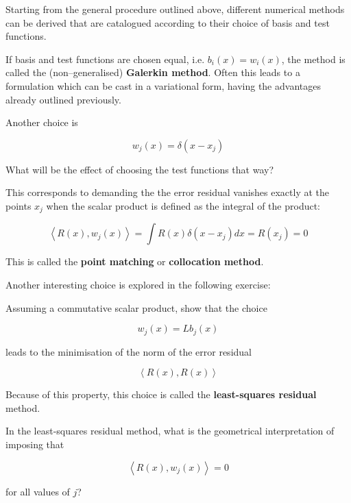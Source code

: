 Starting from the general procedure outlined above, different numerical methods can be derived that are catalogued according to their choice of basis and test functions.

If basis and test functions are chosen equal, i.e. $b_i(x) = w_i(x)$, the method is called the (non--generalised) \textbf{Galerkin method}. Often this leads to a formulation which can be cast in a variational form, having the advantages already outlined previously.

Another choice is

\begin{equation}
w_j(x) = \delta(x-x_j)
\end{equation} 

\begin{cue}
What will be the effect of choosing the test functions that way?  
\end{cue}

This corresponds to demanding the the error residual vanishes exactly at the points $x_j$ when the scalar product is defined as the integral of the product:

\begin{equation}
\left\langle R(x), w_j(x) \right\rangle = \int R(x) \delta(x-x_j) dx = R(x_j) = 0
\end{equation} 

This is called the \textbf{point matching} or \textbf{collocation method}.

Another interesting choice is explored in the following exercise:

\pagebreak

\begin{exer}
Assuming a commutative scalar product, show that the choice 

$$w_j(x) = L b_j(x)$$

leads to the minimisation of the norm of the error residual 

$$\left\langle R(x), R(x) \right\rangle$$ 

Because of this property, this choice is called the \textbf{least-squares residual} method.
\end{exer}

\pagebreak

\begin{exer}
In the least-squares residual method, what is the geometrical interpretation of imposing that 

$$\left\langle R(x), w_j(x) \right\rangle = 0$$ 

for all values of $j$?
\end{exer}


